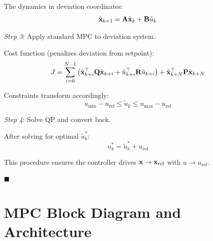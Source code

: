 The dynamics in deviation coordinates:
\begin{equation}
    \tilde{\mathbf{x}}_{k+1} = \mathbf{A} \tilde{\mathbf{x}}_k + \mathbf{B} \tilde{u}_k
\end{equation}

\textit{Step 3}: Apply standard MPC to deviation system.

Cost function (penalizes deviation from setpoint):
\begin{equation}
    J = \sum_{i=0}^{N-1} \left( \tilde{\mathbf{x}}_{k+i}^\top \mathbf{Q} \tilde{\mathbf{x}}_{k+i} + \tilde{u}_{k+i}^\top \mathbf{R} \tilde{u}_{k+i} \right) + \tilde{\mathbf{x}}_{k+N}^\top \mathbf{P} \tilde{\mathbf{x}}_{k+N}
\end{equation}

Constraints transform accordingly:
\begin{equation}
    u_{\min} - u_{\text{ref}} \leq \tilde{u}_k \leq u_{\max} - u_{\text{ref}}
\end{equation}

\textit{Step 4}: Solve QP and convert back.

After solving for optimal $\tilde{u}_k^*$:
\begin{equation}
    u_k^* = \tilde{u}_k^* + u_{\text{ref}}
\end{equation}

This procedure ensures the controller drives $\mathbf{x} \to \mathbf{x}_{\text{ref}}$ with $u \to u_{\text{ref}}$.

\hfill $\blacksquare$

\section{MPC Block Diagram and Architecture}
\label{sec:architecture}

